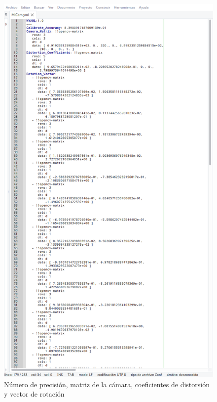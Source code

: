     \begin{figure}[p]
    \centering
    \includegraphics[scale = 0.35]{capitulo_04/figuras_dir/par1.jpg}
    \caption{Número de precisión, matriz de la cámara, coeficientes de distorsión y vector de rotación}
    \label{fig: micam1}
    \end{figure}
    

